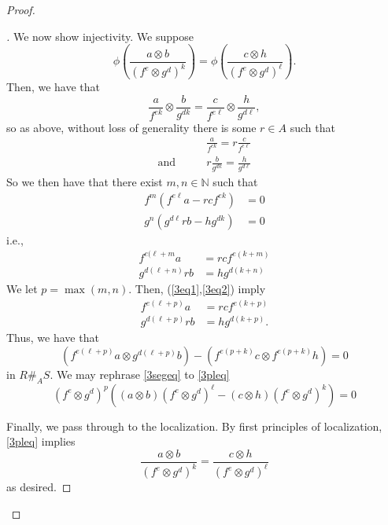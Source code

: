 \documentclass[english,letter,doublesided]{article}
\newcommand{\NN}{\mathbb{N}}
\newenvironment{subproof}[1][\proofname]{%
	\renewcommand{\qedsymbol}{$\blacksquare$}%
	\begin{proof}[#1]%
	}{%
	\end{proof}%
}
\theoremstyle{remark}
\theoremstyle{definition}
\begin{document}
\begin{proof}
\begin{subproof}
We now show injectivity. We suppose $$\phi\left(\frac{a\otimes b}{(f^e\otimes g^d)^k}\right)=\phi\left(\frac{c\otimes h}{(f^e\otimes g^d)^\ell}\right).$$
Then, we have that $$\frac{a}{f^{ek}}\otimes \frac{b}{g^{dk}}=\frac{c}{f^{e\ell}}\otimes \frac{h}{g^{d\ell}},$$ so as above, without loss of generality there is some $r\in A$ such that \begin{align*}
		&\frac{a}{f^{ek}}=r\frac{c}{f^{e\ell}}\\\text{and}\hspace{2em}&r\frac{b}{g^{dk}}=\frac{h}{g^{d\ell}}
	\end{align*}
	So we then have that there exist $m,n\in \NN$ such that \begin{align*}
	f^m(f^{e\ell}a-rcf^{ek})&=0\\
	g^n(g^{d\ell}rb-hg^{dk})&=0
	\end{align*}
	i.e.,
	\begin{align}
	\label{3eq1}f^{e(\ell+m}a&=rcf^{e(k+m)}\\
	\label{3eq2}g^{d(\ell+n)}rb&=hg^{d(k+n)}
	\end{align}
	We let $p=\max{(m,n)}$. Then, (\ref{3eq1},\ref{3eq2}) imply 
		\begin{align*}
	f^{e(\ell+p)}a&=rcf^{e(k+p)}\\
	g^{d(\ell+p)}rb&=hg^{d(k+p)}.
	\end{align*}
	Thus, we have that \begin{equation}\label{3segeq}\left(f^{e(\ell+p)}a\otimes g^{d(\ell+p)}b\right)-\left(f^{e(p+k)}c\otimes f^{e(p+k)}h \right)=0\end{equation} in $R\#_A S$. We may rephrase \eqref{3segeq} to \eqref{3pleq}
	\begin{equation}\label{3pleq}
		(f^e\otimes g^d)^p\left((a\otimes b)(f^e\otimes g^d)^\ell-(c\otimes h)(f^e\otimes g^d)^k\right)=0
	\end{equation}

 Finally, we pass through to the localization. By first principles of localization, \eqref{3pleq} implies \begin{equation*}
 \frac{a\otimes b}{(f^e\otimes g^d)^k}=\frac{c\otimes h}{(f^e\otimes g^d)^\ell}
 \end{equation*} as desired.
 

\end{subproof}
\end{proof}
\end{document}
